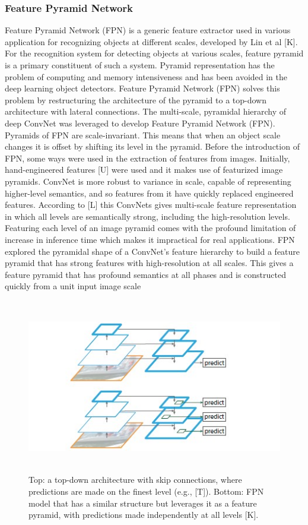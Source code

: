 \subsubsection{Feature Pyramid Network}
Feature Pyramid Network (FPN) is a generic feature extractor used in various application for recognizing objects at different scales, developed by Lin et al [K]. For the recognition system for detecting objects at various scales, feature pyramid is a primary constituent of such a system. Pyramid representation has the problem of computing and memory intensiveness and has been avoided in the deep learning object detectors. Feature Pyramid Network (FPN) solves this problem by restructuring the architecture of the pyramid to a top-down architecture with lateral connections. The multi-scale, pyramidal hierarchy of deep ConvNet was leveraged to develop Feature Pyramid Network (FPN). Pyramids of  FPN are scale-invariant. This means that when an object scale changes it is offset by shifting its level in the pyramid.  
 Before the introduction of FPN, some ways were used in the extraction of features from images. Initially, hand-engineered features [U] were used and it makes use of featurized image pyramids. ConvNet is more robust to variance in scale, capable of representing higher-level semantics, and so features from it have quickly replaced engineered features. According to [L] this ConvNets gives multi-scale feature representation in which all levels are semantically strong, including the high-resolution levels.  Featuring each level of an image pyramid comes with the profound limitation of increase in inference time which makes it impractical for real applications. FPN explored the pyramidal shape of a ConvNet’s feature hierarchy to build a feature pyramid that has strong features with high-resolution at all scales. This gives a feature pyramid that has profound semantics at all phases and is constructed quickly  from a unit  input image scale 
\begin{figure}[H]
\centering
  \includegraphics[height=3in]{images/fpn.jpg}
   \caption{Top: a top-down architecture with skip connections, where predictions are made on the finest level (e.g., [T]). Bottom: FPN model that has a similar structure but leverages it as a feature pyramid, with predictions made independently at all levels [K].}
\end{figure}

